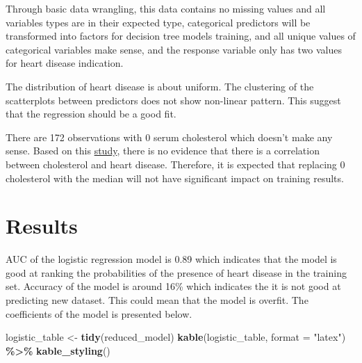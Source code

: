 \documentclass[
]{article}
\newenvironment{Shaded}{\begin{snugshade}}{\end{snugshade}}
\newcommand{\AttributeTok}[1]{\textcolor[rgb]{0.13,0.29,0.53}{#1}}
\newcommand{\FunctionTok}[1]{\textcolor[rgb]{0.13,0.29,0.53}{\textbf{#1}}}
\newcommand{\NormalTok}[1]{#1}
\newcommand{\OtherTok}[1]{\textcolor[rgb]{0.56,0.35,0.01}{#1}}
\newcommand{\SpecialCharTok}[1]{\textcolor[rgb]{0.81,0.36,0.00}{\textbf{#1}}}
\newcommand{\StringTok}[1]{\textcolor[rgb]{0.31,0.60,0.02}{#1}}
\begin{document}
Through basic data wrangling, this data contains no missing values and
all variables types are in their expected type, categorical predictors
will be transformed into factors for decision tree models training, and
all unique values of categorical variables make sense, and the response
variable only has two values for heart disease indication.

The distribution of heart disease is about uniform. The clustering of
the scatterplots between predictors does not show non-linear pattern.
This suggest that the regression should be a good fit.

There are 172 observations with 0 serum cholesterol which doesn't make
any sense. Based on this
\href{https://www.ncbi.nlm.nih.gov/pmc/articles/PMC6024687/}{study},
there is no evidence that there is a correlation between cholesterol and
heart disease. Therefore, it is expected that replacing 0 cholesterol
with the median will not have significant impact on training results.

\hypertarget{results}{%
\section{Results}\label{results}}

AUC of the logistic regression model is 0.89 which indicates that the
model is good at ranking the probabilities of the presence of heart
disease in the training set. Accuracy of the model is around 16\% which
indicates the it is not good at predicting new dataset. This could mean
that the model is overfit. The coefficients of the model is presented
below.

\begin{Shaded}
\begin{Highlighting}[]
\NormalTok{logistic\_table }\OtherTok{\textless{}{-}} \FunctionTok{tidy}\NormalTok{(reduced\_model)}
\FunctionTok{kable}\NormalTok{(logistic\_table, }\AttributeTok{format =} \StringTok{"latex"}\NormalTok{) }\SpecialCharTok{\%\textgreater{}\%}
  \FunctionTok{kable\_styling}\NormalTok{()}
\end{Highlighting}
\end{Shaded}
\end{document}
